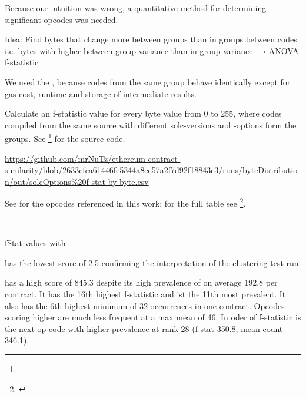 \documentclass[../main.tex]{subfiles}
\begin{document}
Because our intuition was wrong, a quantitative method for determining significant opcodes was needed.

Idea: Find bytes that change more between groups than in groups between codes i.e. bytes with higher between group variance than in group variance. → ANOVA f-statistic

We used the , because codes from the same group behave identically except for gas cost, runtime and storage of intermediate results.


Calculate an f-statistic value for every byte value from 0 to 255, where codes compiled from the same source with different solc-versions and -options form the groups. See \footnote{} for the source-code.

\urldef\urlFstat\url{https://github.com/mrNuTz/ethereum-contract-similarity/blob/2633cfca61446fe5344a8ee57a2f7d92f18843e3/runs/byteDistribution/out/solcOptions%20f-stat-by-byte.csv}

See  for the opcodes referenced in this work; for the full table see \footnote{\bfseries\scriptsize\urlFstat}.

\begin{table}[ht!]
  \centering
  \scriptsize %
  \parbox{5em}{~}
  \caption{fStat values with \n{\solcts}}
  \label{tbl:solcFstat}
\end{table}

 has the lowest score of 2.5 confirming the interpretation of the clustering test-run.

 has a high score of 845.3 despite its high prevalence of on average 192.8 per contract. It has the 16th highest f-statistic and ist the 11th most prevalent. It also has the 6th highest minimum of 32 occurrences in one contract. Opcodes scoring higher are much less frequent at a max mean of 46. In oder of f-statistic  is the next op-code with higher prevalence at rank 28 (f-stat 350.8, mean count 346.1).
\end{document}
